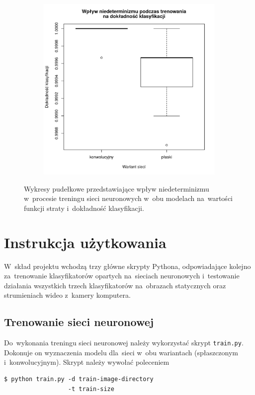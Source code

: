\documentclass[11pt,a4paper]{article}
\begin{document}
\begin{figure}
\begin{subfigure}{0.45\textwidth}
        \includegraphics[width=\textwidth]{res/img/randomness_accuracy.pdf}
    \end{subfigure}
    \caption{Wykresy pudełkowe przedstawiające wpływ niedeterminizmu w~procesie treningu sieci neuronowych w~obu modelach na~wartości funkcji straty i~dokładność klasyfikacji.}
    \label{fig:nondeterminism}
\end{figure}

\section{Instrukcja użytkowania}

W~skład projektu wchodzą trzy główne skrypty Pythona, odpowiadające kolejno za~trenowanie klasyfikatorów opartych na~sieciach neuronowych i~testowanie działania wszystkich trzech klasyfikatorów na~obrazach statycznych oraz strumieniach wideo z~kamery komputera. 

\subsection{Trenowanie sieci neuronowej}

Do~wykonania treningu sieci neuronowej należy wykorzystać skrypt \verb+train.py+.
Dokonuje on wyznaczenia modelu dla~sieci w~obu wariantach (spłaszczonym i~konwolucyjnym).
Skrypt należy wywołać poleceniem
\begin{verbatim}
$ python train.py -d train-image-directory
                  -t train-size
\end{verbatim}
\end{document}
